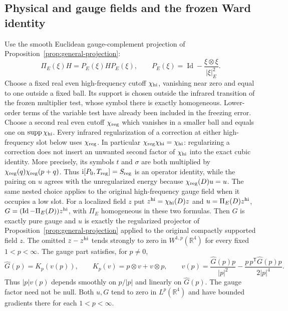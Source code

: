 \documentclass[11pt,a4paper]{article}
\numberwithin{equation}{section}
\newcommand{\Id}{\operatorname{Id}}
\newcommand{\supp}{\operatorname{supp}}
\newcommand{\R}{\mathbb R}
\newcommand{\f}[2]{\frac{#1}{#2}}
\newcommand{\ii}{\mathrm{i}}
\theoremstyle{definition}
\begin{document}
\subsection{Physical and gauge fields and the frozen Ward identity}

Use the smooth Euclidean gauge-complement projection of
Proposition~\ref{prop:general-projection}:
\begin{equation*}
\Pi_E(\xi)H=P_E(\xi)HP_E(\xi),\qquad
P_E(\xi)=\Id-\f{\xi\otimes\xi}{|\xi|_E^2}.
\end{equation*}
Choose a fixed real even high-frequency cutoff $\chi_{\rm hi}$,
vanishing near zero and equal to one outside a fixed ball. Its support
is chosen outside the infrared transition of the frozen multiplier
test, whose symbol there is exactly homogeneous. Lower-order terms of
the variable test have already been included in the freezing error.
Choose a second real even cutoff $\chi_{\rm reg}$ which vanishes in a
smaller ball and equals one on $\supp\chi_{\rm hi}$. Every infrared
regularization of a correction at either high-frequency slot below uses
$\chi_{\rm reg}$. In particular
$\chi_{\rm reg}\chi_{\rm hi}=\chi_{\rm hi}$: regularizing a correction
does not insert an unwanted second factor of $\chi_{\rm hi}$ into the
exact cubic identity. More precisely, its symbols $t$ and $\sigma$
are both multiplied by $\chi_{\rm reg}(q)\chi_{\rm reg}(p+q)$.
Thus $\ii [P_0,T_{\rm reg}]=S_{\rm reg}$ is an operator identity, while
the pairing on $u$ agrees with the unregularized energy because
$\chi_{\rm reg}(D)u=u$. The same nested choice applies to the original
high-frequency gauge field when it occupies a low slot.
For a localized
field $z$ put $z^{\rm hi}=\chi_{\rm hi}(D)z$ and
$u=\Pi_E(D)z^{\rm hi}$, $G=(\Id-\Pi_E(D))z^{\rm hi}$, with
$\Pi_E$ homogeneous in these two formulas. Then $G$ is exactly pure gauge
and $u$ is exactly the regularized projector of
Proposition~\ref{prop:general-projection} applied to the original compactly supported
field $z$. The omitted $z-z^{\rm hi}$ tends strongly to zero in $W^{1,p}(\R^4)$ for every fixed $1<p<\infty$. The gauge part satisfies, for $p\ne0$,
\begin{equation}\label{eq:var-gauge-potential}
\widehat G(p)=K_p(v(p)),\qquad
K_p(v)=p\otimes v+v\otimes p,\qquad
v(p)=\f{\widehat G(p)p}{|p|^2}
-\f{p\,p^{\mathsf T}\widehat G(p)p}{2|p|^4}.
\end{equation}
Thus $|p|v(p)$ depends smoothly on $p/|p|$ and linearly on $\widehat G(p)$.
The gauge factor need not be null. Both $u,G$ tend to zero in
$L^p(\R^4)$ and have bounded gradients there for each $1<p<\infty$.
\end{document}
